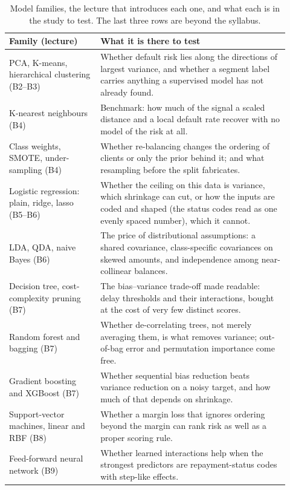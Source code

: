 \begin{table}[htbp]
  \caption{Model families, the lecture that introduces each one, and what each is in the study to test. The last three rows are beyond the syllabus.}
  \label{tab:a-methods}
  \centering
  \small
  \begin{tabular}{@{}L{0.30\linewidth}L{0.62\linewidth}@{}}
    \toprule
    Family (lecture) & What it is there to test \\
    \midrule
    PCA, K-means, hierarchical clustering (B2--B3) & Whether default risk lies along the directions of largest variance, and whether a segment label carries anything a supervised model has not already found. \\
    K-nearest neighbours (B4) & Benchmark: how much of the signal a scaled distance and a local default rate recover with no model of the risk at all. \\
    Class weights, SMOTE, under-sampling (B4) & Whether re-balancing changes the ordering of clients or only the prior behind it; and what resampling before the split fabricates. \\
    Logistic regression: plain, ridge, lasso (B5--B6) & Whether the ceiling on this data is variance, which shrinkage can cut, or how the inputs are coded and shaped (the status codes read as one evenly spaced number), which it cannot. \\
    LDA, QDA, naive Bayes (B6) & The price of distributional assumptions: a shared covariance, class-specific covariances on skewed amounts, and independence among near-collinear balances. \\
    Decision tree, cost-complexity pruning (B7) & The bias--variance trade-off made readable: delay thresholds and their interactions, bought at the cost of very few distinct scores. \\
    Random forest and bagging (B7) & Whether de-correlating trees, not merely averaging them, is what removes variance; out-of-bag error and permutation importance come free. \\
    Gradient boosting and XGBoost (B7) & Whether sequential bias reduction beats variance reduction on a noisy target, and how much of that depends on shrinkage. \\
    Support-vector machines, linear and RBF (B8) & Whether a margin loss that ignores ordering beyond the margin can rank risk as well as a proper scoring rule. \\
    Feed-forward neural network (B9) & Whether learned interactions help when the strongest predictors are repayment-status codes with step-like effects. \\

\end{tabular}
\end{table}
